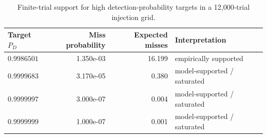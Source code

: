 \begin{table}[ht]
\centering
\caption{Finite-trial support for high detection-probability targets in a 12,000-trial injection grid.}
\label{tab:finite-trial-support}
\begin{tabular}{l r r l}
\toprule
Target $P_D$ & Miss probability & Expected misses & Interpretation \\
\midrule
$0.9986501$ & 1.350e-03 & 16.199 & empirically supported \\
$0.9999683$ & 3.170e-05 & 0.380 & model-supported / saturated \\
$0.9999997$ & 3.000e-07 & 0.004 & model-supported / saturated \\
$0.9999999$ & 1.000e-07 & 0.001 & model-supported / saturated \\
\bottomrule
\end{tabular}
\end{table}